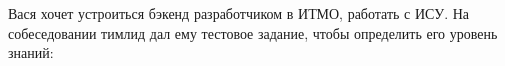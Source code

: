\documentclass[10pt]{exam}
\begin{document}
\begin{questions}
\question
Вася хочет устроиться бэкенд разработчиком в ИТМО, работать с ИСУ. На собеседовании тимлид дал ему тестовое задание, чтобы определить его уровень знаний:
\\
\begin{figure}[h]

\begin{minipage}[h]{0.55\linewidth}
\end{minipage}
\begin{minipage}[h]{0.45\linewidth}
\end{minipage}
\end{figure}


\end{questions}
\end{document}
